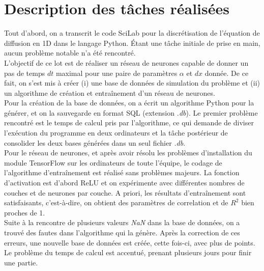 \documentclass[a4paper,12pt,french]{article}
\begin{document}


\section{Description des tâches réalisées}
Tout d'abord, on a transcrit le code SciLab pour la discrétisation
de l'équation de diffusion en 1D dans le langage Python. \'Etant une 
tâche initiale de prise en main, aucun problème notable n'a été 
rencontré.
\\

L'objectif de ce lot est de réaliser un réseau de neurones capable
de donner un pas de temps $dt$ maximal pour une paire de paramètres
$\alpha$ et $dx$ donnée. De ce fait, on s'est mis à créer (i) une 
base de données de simulation du problème et (ii) un algorithme
de création et entraînement d'un réseau de neurones.
\\

Pour la création de la base de données, on a écrit un algorithme Python
pour la générer, et on la sauvegarde en format SQL (extension \textit{.db}).
Le premier problème rencontré est le temps de calcul pris par l'algorithme,
ce qui demande de diviser l'exécution du programme en deux 
ordinateurs et la tâche postérieur de consolider les deux bases
générées dans un seul fichier \textit{.db}.
\\

Pour le réseau de neurones, et après avoir résolu les problèmes
d'installation du module TensorFlow sur les ordinateurs de toute l'équipe,
le codage de l'algorithme d'entraînement est réalisé sans problèmes majeurs. La fonction d'activation est d'abord ReLU et on expérimente avec différentes nombres de couches et de neurones par couche.
A priori, les résultats d'entraînement sont satisfaisants, c'est-à-dire, on
obtient des paramètres de correlation et de $R^2$ bien proches de 1.
\\

Suite à la rencontre de plusieurs valeurs \textit{NaN} dans la 
base de données, on a trouvé des fautes dans l'algorithme qui
la génère. Après la correction de ces erreurs, une nouvelle base
de données est créée, cette fois-ci, avec plus de points. Le problème du temps de calcul est accentué, prenant plusieurs jours pour finir une partie. 
\\
\end{document}
